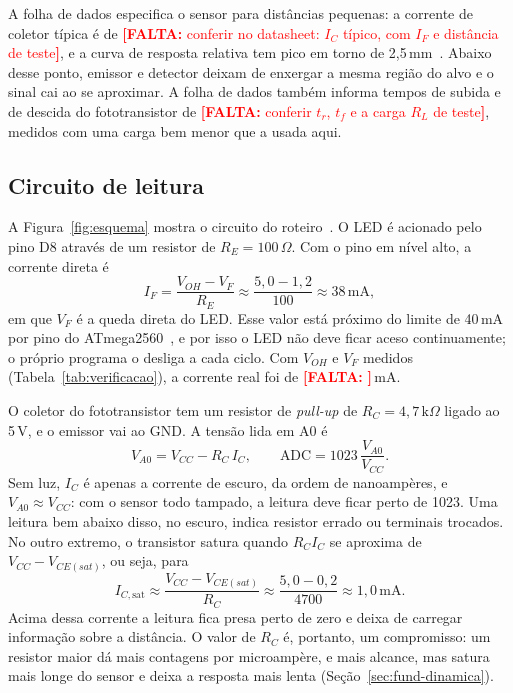 \documentclass[11pt,a4paper]{article}
\newcommand{\pendente}[1]{\textcolor{red}{\textbf{[FALTA:} #1\textbf{]}}}
\begin{document}
A folha de dados especifica o sensor para distâncias pequenas: a corrente de coletor típica é de \pendente{conferir no datasheet: $I_C$ típico, com $I_F$ e distância de teste}, e a curva de resposta relativa tem pico em torno de 2,5\,mm~\cite{tcrt5000}. Abaixo desse ponto, emissor e detector deixam de enxergar a mesma região do alvo e o sinal cai ao se aproximar. A folha de dados também informa tempos de subida e de descida do fototransistor de \pendente{conferir $t_r$, $t_f$ e a carga $R_L$ de teste}, medidos com uma carga bem menor que a usada aqui.

\subsection{Circuito de leitura}

A Figura~\ref{fig:esquema} mostra o circuito do roteiro~\cite{roteiro}. O LED é acionado pelo pino D8 através de um resistor de $R_E = 100\,\Omega$. Com o pino em nível alto, a corrente direta é
\begin{equation}
I_F = \frac{V_{OH} - V_F}{R_E} \approx \frac{5{,}0 - 1{,}2}{100} \approx 38\,\text{mA},
\label{eq:if}
\end{equation}
em que $V_F$ é a queda direta do LED. Esse valor está próximo do limite de 40\,mA por pino do ATmega2560~\cite{atmega2560}, e por isso o LED não deve ficar aceso continuamente; o próprio programa o desliga a cada ciclo. Com $V_{OH}$ e $V_F$ medidos (Tabela~\ref{tab:verificacao}), a corrente real foi de \pendente{}\,mA.

O coletor do fototransistor tem um resistor de \textit{pull-up} de $R_C = 4{,}7\,\text{k}\Omega$ ligado ao 5\,V, e o emissor vai ao GND. A tensão lida em A0 é
\begin{equation}
V_{A0} = V_{CC} - R_C\, I_C ,
\qquad
\text{ADC} = 1023\,\frac{V_{A0}}{V_{CC}} .
\label{eq:va0}
\end{equation}
Sem luz, $I_C$ é apenas a corrente de escuro, da ordem de nanoampères, e $V_{A0} \approx V_{CC}$: com o sensor todo tampado, a leitura deve ficar perto de 1023. Uma leitura bem abaixo disso, no escuro, indica resistor errado ou terminais trocados. No outro extremo, o transistor satura quando $R_C I_C$ se aproxima de $V_{CC} - V_{CE(sat)}$, ou seja, para
\begin{equation}
I_{C,\text{sat}} \approx \frac{V_{CC} - V_{CE(sat)}}{R_C} \approx \frac{5{,}0 - 0{,}2}{4700} \approx 1{,}0\,\text{mA}.
\end{equation}
Acima dessa corrente a leitura fica presa perto de zero e deixa de carregar informação sobre a distância. O valor de $R_C$ é, portanto, um compromisso: um resistor maior dá mais contagens por microampère, e mais alcance, mas satura mais longe do sensor e deixa a resposta mais lenta (Seção~\ref{sec:fund-dinamica}).
\end{document}
